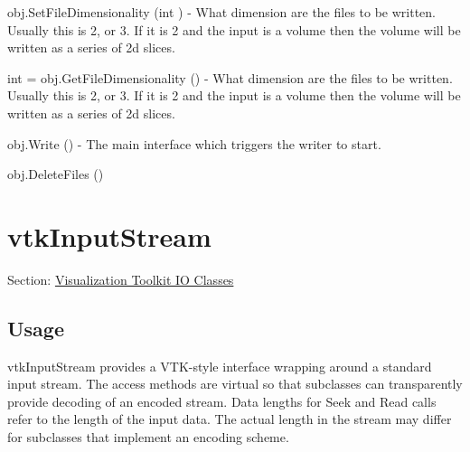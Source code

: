 \begin{DoxyItemize}
\item {\ttfamily obj.\-Set\-File\-Dimensionality (int )} -\/ What dimension are the files to be written. Usually this is 2, or 3. If it is 2 and the input is a volume then the volume will be written as a series of 2d slices.  
\item {\ttfamily int = obj.\-Get\-File\-Dimensionality ()} -\/ What dimension are the files to be written. Usually this is 2, or 3. If it is 2 and the input is a volume then the volume will be written as a series of 2d slices.  
\item {\ttfamily obj.\-Write ()} -\/ The main interface which triggers the writer to start.  
\item {\ttfamily obj.\-Delete\-Files ()}  
\end{DoxyItemize}\hypertarget{vtkio_vtkinputstream}{}\section{vtk\-Input\-Stream}\label{vtkio_vtkinputstream}
Section\-: \hyperlink{sec_vtkio}{Visualization Toolkit I\-O Classes} \hypertarget{vtkwidgets_vtkxyplotwidget_Usage}{}\subsection{Usage}\label{vtkwidgets_vtkxyplotwidget_Usage}
vtk\-Input\-Stream provides a V\-T\-K-\/style interface wrapping around a standard input stream. The access methods are virtual so that subclasses can transparently provide decoding of an encoded stream. Data lengths for Seek and Read calls refer to the length of the input data. The actual length in the stream may differ for subclasses that implement an encoding scheme.

